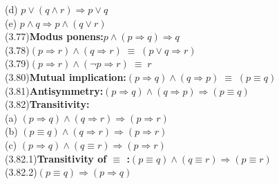 \documentclass[fleqn, leqno]{article}
\newcommand{\lgap}{2pt}                             %
\newcommand{\equivs}{\ensuremath{\;\equiv\;}}       %
\newcommand{\impl}{\ensuremath{\Rightarrow}}        %
\begin{document}
\begin{tabbing}
      \> (d)\> $p\lor (q\land r) \impl p\lor q$\\[\lgap]
      \> (e)\> $p\land q \impl p\land (q \lor r)$\\[\lgap]
(3.77)\>\textbf{Modus ponens:}\quad $p\land (p\impl q)\impl q$\\[\lgap]
(3.78)\>$(p\impl r) \land (q\impl r) \equivs (p\lor q\impl r)$\\[\lgap]
(3.79)\>$(p\impl r) \land (\neg p\impl r) \equivs r$\\[\lgap]
(3.80)\>\textbf{Mutual implication:}\quad $(p\impl q) \land (q\impl p) \equivs (p\equiv q)$\\[\lgap]
(3.81)\>\textbf{Antisymmetry:}\quad $(p\impl q) \land (q\impl p) \impl (p\equiv q)$\\[\lgap]
(3.82)\>\textbf{Transitivity:}\\
      \> (a)\> $(p\impl q) \land (q\impl r) \impl (p\impl r)$\\[\lgap]
      \> (b)\> $(p\equiv q) \land (q\impl r) \impl (p\impl r)$\\[\lgap]
      \> (c)\> $(p\impl q) \land (q\equiv r) \impl (p\impl r)$\\[\lgap]
(3.82.1)\>\textbf{Transitivity of $\equiv$ :}\quad $(p\equiv q)\land (q\equiv r)\impl (p\equiv r)$\\[\lgap]
(3.82.2)\>$(p\equiv q)\impl (p\impl q)$\\
\end{tabbing}
\end{document}
